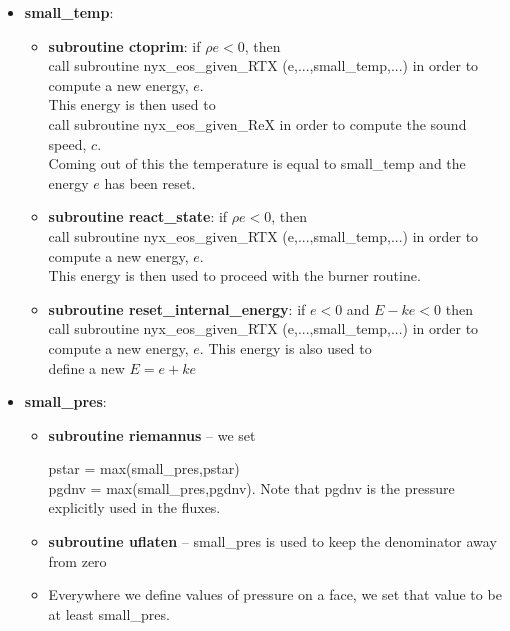 \begin{itemize}
\item {\bf small\_temp}:  
\begin{itemize}
\item {\bf subroutine ctoprim}:  if $\rho e < 0$, then \\

 call subroutine nyx\_eos\_given\_RTX (e,...,small\_temp,...) in order to compute a new energy, $e$.  \\

 This energy is then used to  \\

 call subroutine nyx\_eos\_given\_ReX in order to compute the sound speed, $c.$ \\

Coming out of this the temperature is equal to small\_temp and the energy $e$ has been reset.

\item {\bf subroutine react\_state}:  if $\rho e < 0$, then \\

 call subroutine nyx\_eos\_given\_RTX (e,...,small\_temp,...) in order to compute a new energy, $e$.  \\

 This energy is then used to proceed with the burner routine. \\

\item {\bf subroutine reset\_internal\_energy}:  if $e < 0$ and $E - ke < 0$  then  \\

 call subroutine nyx\_eos\_given\_RTX (e,...,small\_temp,...) in order to compute a new energy, $e$.  This energy is also used to  \\

 define a new $E = e + ke$ 

\end{itemize}

\item {\bf small\_pres}:  
\begin{itemize}

\item   {\bf subroutine riemannus} -- we set 

pstar = max(small\_pres,pstar)  \\

pgdnv = max(small\_pres,pgdnv).  Note that pgdnv is the pressure explicitly used in the fluxes.

\item   {\bf subroutine uflaten} -- small\_pres is used to keep the denominator away from zero

\item   Everywhere we define values of pressure on a face, we set that value to be at least small\_pres.

\end{itemize}

\end{itemize}
